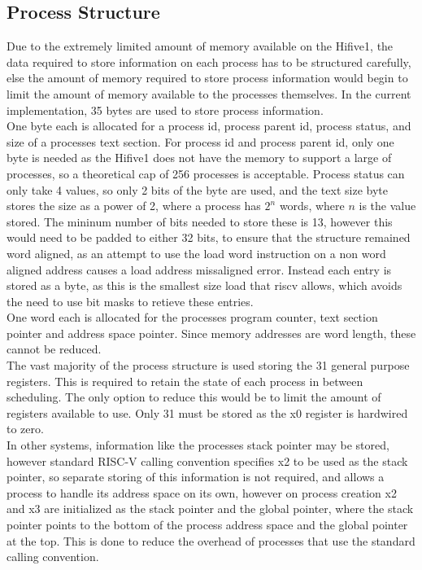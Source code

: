\subsection{Process Structure}
Due to the extremely limited amount of memory available on the Hifive1, the data required to store information on each process has to be structured carefully, else the amount of memory required to store process information would begin to limit the amount of memory available to the processes themselves. In the current implementation, 35 bytes are used to store process information.
\\
One byte each is allocated for a process id, process parent id, process status, and size of a processes text section. For process id and process parent id, only one byte is needed as the Hifive1 does not have the memory to support a large of processes, so a theoretical cap of 256 processes is acceptable. Process status can only take 4 values, so only 2 bits of the byte are used, and the text size byte stores the size as a power of 2, where a process has \(2^n\) words, where \(n\) is the value stored. The mininum number of bits needed to store these is 13, however this would need to be padded to either 32 bits, to ensure that the structure remained word aligned, as an attempt to use the load word instruction on a non word aligned address causes a load address missaligned error. Instead each entry is stored as a byte, as this is the smallest size load that \gls{riscv} allows, which avoids the need to use bit masks to retieve these entries.
\\
One word each is allocated for the processes program counter, text section pointer and address space pointer. Since memory addresses are word length, these cannot be reduced.
\\
The vast majority of the process structure is used storing the 31 general purpose registers. This is required to retain the state of each process in between scheduling. The only option to reduce this would be to limit the amount of registers available to use. Only 31 must be stored as the x0 register is hardwired to zero.
\\
In other systems, information like the processes stack pointer may be stored, however standard RISC-V calling convention specifies x2 to be used as the stack pointer, so separate storing of this information is not required, and allows a process to handle its address space on its own, however on process creation x2 and x3 are initialized as the stack pointer and the global pointer, where the stack pointer points to the bottom of the process address space and the global pointer at the top. This is done to reduce the overhead of processes that use the standard calling convention.
